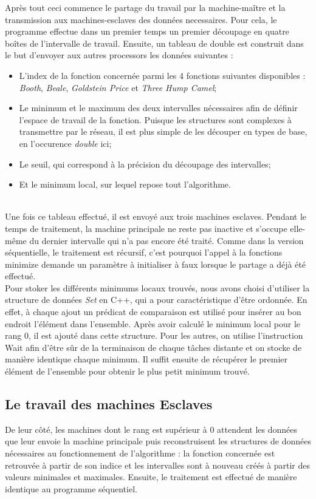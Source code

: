 			Après tout ceci commence le partage du travail par la machine-maître et la transmission aux machines-esclaves des données necessaires. Pour cela, le programme effectue dans un premier temps un premier découpage en quatre boîtes de l'intervalle de travail. Ensuite, un tableau de double est construit dans le but d'envoyer aux autres \og processors \fg les données suivantes : \\
			\begin{itemize}
				\item L'index de la fonction concernée parmi les 4 fonctions suivantes disponibles : \emph{Booth}, \emph{Beale}, \emph{Goldstein Price} et \emph{Three Hump Camel};
				\item Le minimum et le maximum des deux intervalles nécessaires afin de définir l'espace de travail de la fonction. Puisque les structures sont complexes à transmettre par le réseau, il est plus simple de les découper en types de base, en l'occurence \emph{double} ici;
				\item Le seuil, qui correspond à la précision du découpage des intervalles;
				\item Et le minimum local, sur lequel repose tout l'algorithme.
			\end{itemize}
			~\\
			
			Une fois ce tableau effectué, il est envoyé aux trois machines esclaves. Pendant le temps de traitement, la machine principale ne reste pas inactive et s'occupe elle-même du dernier intervalle qui n'a pas encore été traité. Comme dans la version séquentielle, le traitement est récursif, c'est pourquoi l'appel à la fonctions minimize demande un paramètre à initialiser à faux lorsque le partage a déjà été effectué.\\
			
			Pour stoker les différents minimums locaux trouvés, nous avons choisi d'utiliser la structure de données \emph{Set} en C++, qui a pour caractéristique d'être ordonnée. En effet, à chaque ajout un prédicat de comparaison est utilisé pour insérer au bon endroit l'élément dans l'ensemble. Après avoir calculé le minimum local pour le rang 0, il est ajouté dans cette structure. Pour les autres, on utilise l'instruction Wait afin d'être sûr de la terminaison de chaque tâches distante et on stocke de manière identique chaque minimum. Il suffit ensuite de récupérer le premier élément de l'ensemble pour obtenir le plus petit minimum trouvé.
			
		\subsection{Le travail des machines \og Esclaves \fg}
			De leur côté, les machines dont le rang est supérieur à 0 attendent les données que leur envoie la machine principale puis reconstruisent les structures de données nécessaires au fonctionnement de l'algorithme : la fonction concernée est retrouvée à partir de son indice et les intervalles sont à nouveau créés à partir des valeurs minimales et maximales. Ensuite, le traitement est effectué de manière identique au programme séquentiel. \\
			
